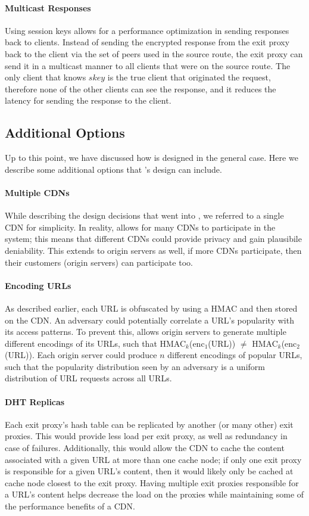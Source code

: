 \paragraph{Multicast Responses}
Using session keys allows for a performance optimization in sending responses back to clients.  Instead of sending 
the encrypted response from the exit proxy back to the client via the set of peers used in the source route, the exit 
proxy can send it in a multicast manner to all clients that were on the source route.  The only client that knows $skey$ 
is the true client that originated the request, therefore none of the other clients can see the response, and it reduces the 
latency for sending the response to the client.  

\subsection{Additional Options}
Up to this point, we have discussed how \system{} is designed in the general case.  Here we describe some 
additional options that \system{}'s design can include.

\paragraph{Multiple CDNs}
While describing the design decisions that went into \system{}, we referred to a single CDN for 
simplicity.  In reality, \system{} allows for many CDNs to participate in the system; this means that 
different CDNs could provide privacy and gain plausibile deniability.  This extends to origin servers 
as well, if more CDNs participate, then their customers (origin servers) can participate too.

\paragraph{Encoding URLs}
As described earlier, each URL is obfuscated by using a HMAC and then stored on the CDN.  An adversary 
could potentially correlate a URL's popularity with its access patterns.  To prevent this, \system{} allows 
origin servers to generate multiple different encodings of its URLs, such that HMAC$_k$(enc$_1$(URL)) $\neq$ 
HMAC$_k$(enc$_2$(URL)).  Each origin server could produce $n$ different encodings of popular URLs, such that 
the popularity distribution seen by an adversary is a uniform distribution of URL requests across all URLs.  

\paragraph{DHT Replicas}
Each exit proxy's hash table can be replicated by another (or many other) exit proxies.  This 
would provide less load per exit proxy, as well as redundancy in case of failures.  Additionally, 
this would allow the CDN to cache the content associated with a given URL at more than one cache node; 
if only one exit proxy is responsible for a given URL's content, then it would likely only be cached at 
cache node closest to the exit proxy.  Having multiple exit proxies responsible for a URL's content 
helps decrease the load on the proxies while maintaining some of the performance benefits of a CDN.

